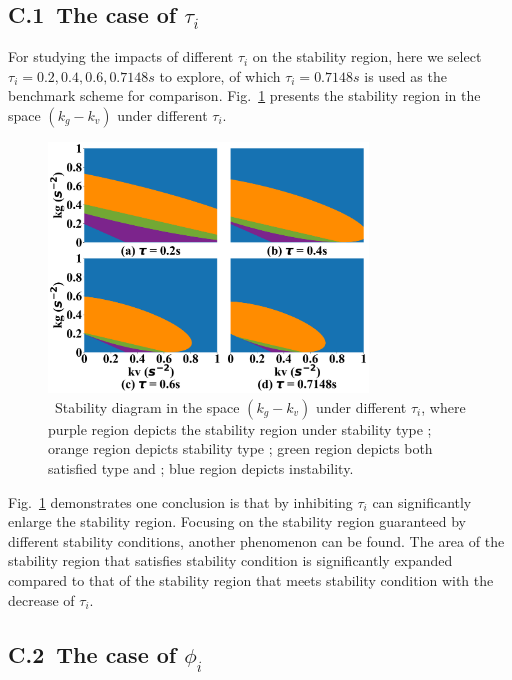 \documentclass[journal]{IEEEtran}
\begin{document}
\subsection*{C.1~The case of $\tau_i$}

For studying the impacts of different $\tau_i$ on the stability region, here we select $\tau_i=0.2,0.4,0.6,0.7148 s$ to explore, of which $\tau_i=0.7148s$ is used as the benchmark scheme for comparison. Fig.~\ref{fig8} presents the stability region in the space $(k_g-k_v)$ under different $\tau_i$.

\begin{figure}
  \centering
  \includegraphics[width=8.5cm]{figs/fig8.png}
  \caption{~Stability diagram in the space $(k_g-k_v)$ under different $\tau_i$, where purple region depicts the stability region under stability type \uppercase\expandafter{}; orange region depicts stability type \uppercase\expandafter{}; green region depicts both satisfied type \uppercase\expandafter{} and \uppercase\expandafter{}; blue region depicts instability.}
  \label{fig8}
\end{figure}

Fig.~\ref{fig8} demonstrates one conclusion is that by inhibiting $\tau_i$ can significantly enlarge the stability region. Focusing on the stability region guaranteed by different stability conditions, another phenomenon can be found. The area of the stability region that satisfies stability condition \uppercase\expandafter{} is significantly expanded compared to that of the stability region that meets stability condition \uppercase\expandafter{} with the decrease of $\tau_i$.

\subsection*{C.2~The case of $\phi_i$}
\end{document}
